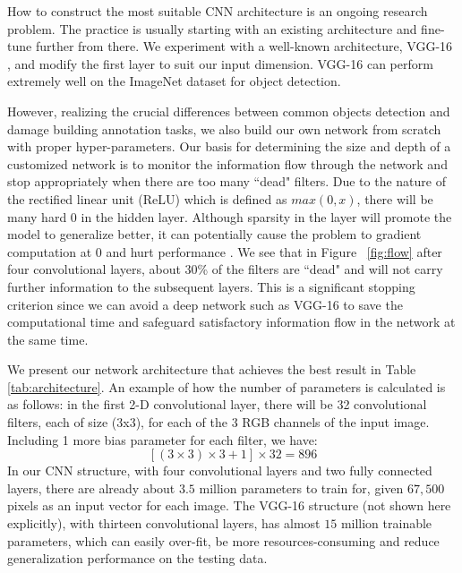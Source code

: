 \documentclass[journal, 12pt, onecolumn,draftclsnofoot]{IEEEtran}
\begin{document}
How to construct the most suitable CNN architecture is an ongoing research problem. The practice is usually starting with an existing architecture and fine-tune further from there. We experiment with a well-known architecture, VGG-16 \cite{vgg16}, and modify the first layer to suit our input dimension. VGG-16 can perform extremely well on the ImageNet dataset for object detection. 

However, realizing the crucial differences between common objects detection and damage building annotation tasks, we also build our own network from scratch with proper hyper-parameters. Our basis for determining the size and depth of a customized network is to monitor the information flow through the network and stop appropriately when there are too many ``dead" filters. Due to the nature of the rectified linear unit (ReLU) which is defined as $max(0,x)$, there will be many hard 0 in the hidden layer. Although sparsity in the layer will promote the model to generalize better, it can potentially cause the problem to gradient computation at 0 and hurt performance \cite{relu,leaky}. We see that in Figure ~\ref{fig:flow} after four convolutional layers, about 30\% of the filters are ``dead" and will not carry further information to the subsequent layers. This is a significant stopping criterion since we can avoid a deep network such as VGG-16 to save the computational time and safeguard satisfactory information flow in the network at the same time. 

We present our network architecture that achieves the best result in Table \ref{tab:architecture}. An example of how the number of parameters is calculated is as follows: in the first 2-D convolutional layer, there will be 32 convolutional filters, each of size (3x3), for each of the 3 RGB channels of the input image. Including 1 more bias parameter for each filter, we have: \\
\[
[(3 \times 3) \times 3 + 1] \times 32 = 896
\]
In our CNN structure, with four convolutional layers and two fully connected layers, there are already about $3.5$ million parameters to train for, given $67,500$ pixels as an input vector for each image. The VGG-16 structure (not shown here explicitly), with thirteen convolutional layers, has almost $15$ million trainable parameters, which can easily over-fit, be more resources-consuming and reduce generalization performance on the testing data. 
\end{document}
